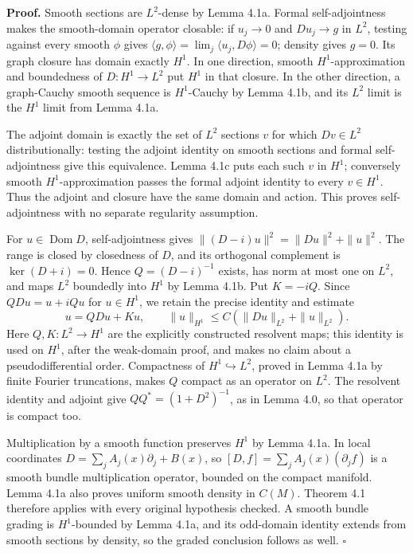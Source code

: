 \documentclass[
  11pt,
]{article}
\begin{document}
\textbf{Proof.} Smooth sections are \(L^2\)-dense by Lemma 4.1a. Formal
self-adjointness makes the smooth-domain operator closable: if
\(u_j\to0\) and \(Du_j\to g\) in \(L^2\), testing against every smooth
\(\phi\) gives
\(\langle g,\phi\rangle=\lim_j\langle u_j,D\phi\rangle=0\); density
gives \(g=0\). Its graph closure has domain exactly \(H^1\). In one
direction, smooth \(H^1\)-approximation and boundedness of
\(D:H^1\to L^2\) put \(H^1\) in that closure. In the other direction, a
graph-Cauchy smooth sequence is \(H^1\)-Cauchy by Lemma 4.1b, and its
\(L^2\) limit is the \(H^1\) limit from Lemma 4.1a.

The adjoint domain is exactly the set of \(L^2\) sections \(v\) for
which \(Dv\in L^2\) distributionally: testing the adjoint identity on
smooth sections and formal self-adjointness give this equivalence. Lemma
4.1c puts each such \(v\) in \(H^1\); conversely smooth
\(H^1\)-approximation passes the formal adjoint identity to every
\(v\in H^1\). Thus the adjoint and closure have the same domain and
action. This proves self-adjointness with no separate regularity
assumption.

For \(u\in\operatorname{Dom}D\), self-adjointness gives
\(\|(D-i)u\|^2=\|Du\|^2+\|u\|^2\). The range is closed by closedness of
\(D\), and its orthogonal complement is \(\ker(D+i)=0\). Hence
\(Q=(D-i)^{-1}\) exists, has norm at most one on \(L^2\), and maps
\(L^2\) boundedly into \(H^1\) by Lemma 4.1b. Put \(K=-iQ\). Since
\(QDu=u+iQu\) for \(u\in H^1\), we retain the precise identity and
estimate \[
u=QDu+Ku,\qquad
\|u\|_{H^1}\leq C(\|Du\|_{L^2}+\|u\|_{L^2}).
\tag{4.6}
\] Here \(Q,K:L^2\to H^1\) are the explicitly constructed resolvent
maps; this identity is used on \(H^1\), after the weak-domain proof, and
makes no claim about a pseudodifferential order. Compactness of
\(H^1\hookrightarrow L^2\), proved in Lemma 4.1a by finite Fourier
truncations, makes \(Q\) compact as an operator on \(L^2\). The
resolvent identity and adjoint give \(QQ^*=(1+D^2)^{-1}\), as in Lemma
4.0, so that operator is compact too.

Multiplication by a smooth function preserves \(H^1\) by Lemma 4.1a. In
local coordinates \(D=\sum_jA_j(x)\partial_j+B(x)\), so
\([D,f]=\sum_jA_j(x)(\partial_jf)\) is a smooth bundle multiplication
operator, bounded on the compact manifold. Lemma 4.1a also proves
uniform smooth density in \(C(M)\). Theorem 4.1 therefore applies with
every original hypothesis checked. A smooth bundle grading is
\(H^1\)-bounded by Lemma 4.1a, and its odd-domain identity extends from
smooth sections by density, so the graded conclusion follows as well.
\(\square\)
\end{document}

